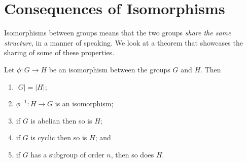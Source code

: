 \section{Consequences of Isomorphisms}
Isomorphisms between groups means that the two groups \textit{share the same structure}, in a manner of speaking. We look at a theorem that showcases the sharing of some of these properties.
\begin{theorem}\label{thrm-isomorphism-consequences}
    Let $\phi: G \to H$ be an isomorphism between the groups $G$ and $H$. Then
    \begin{enumerate}
        \item $|G| = |H|$;
        \item $\phi^{-1}: H \to G$ is an isomorphism;
        \item if $G$ is abelian then so is $H$;
        \item if $G$ is cyclic then so is $H$; and
        \item if $G$ has a subgroup of order $n$, then so does $H$.
    \end{enumerate}
\end{theorem}
